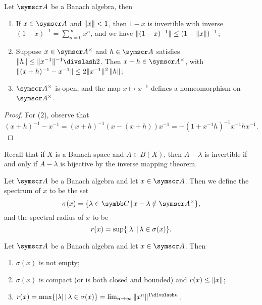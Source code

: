 \begin{proposition}
  Let $\BA{A}$ be a Banach algebra, then
  \begin{enumerate}
    \item If $x\in \BA{A}$ and $\Vert x\Vert<1$, then $1-x$ is invertible with inverse $(1-x)^{-1}=\sum_{n=0}^\infty x^n$, and we have $\Vert(1-x)^{-1}\Vert\leq (1-\Vert x\Vert)^{-1}$;
    \item Suppose $x\in \BA{A}^\times$ and $h\in \BA{A}$ satisfies $\NORM{h}\leq\NORM{x^{-1}}^{-1}\DIV 2$. Then $x+h\in \BA{A}^{\times}$, with $\Vert(x+h)^{-1}-x^{-1}\Vert\leq 2\Vert x^{-1}\Vert^2\,\Vert h\Vert$;
    \item $\BA{A}^\times$ is open, and the map $x\mapsto x^{-1}$ defines a homeomorphism on $\BA{A}^\times$.
  \end{enumerate}
\end{proposition}

\begin{proof}
  For (2), observe that
  \begin{equation}
    (x+h)^{-1}-x^{-1}=(x+h)^{-1}(x-(x+h))x^{-1}=-(1+x^{-1}h)^{-1}x^{-1}hx^{-1}.
  \end{equation}
\end{proof}

Recall that if $X$ is a Banach space and $A\in B(X)$, then $A-\lambda$ is invertible if and only if $A-\lambda$ is bijective by the inverse mapping theorem.

\begin{definition}
  Let $\BA A$ be a Banach algebra and let $x\in \BA A$. Then we define the spectrum of $x$ to be the set
  \begin{equation*}
    \sigma(x)=\{\lambda\in \CC\VERT x-\lambda\notin \BA{A}^{\times}\},
  \end{equation*}
  and the spectral radius of $x$ to be
  \begin{equation*}
    r(x)=\sup\{\vert\lambda\vert\,\vert\, \lambda\in \sigma(x)\}.
  \end{equation*}
\end{definition}

\begin{proposition}
  Let $\BA A$ be a Banach algebra and let $x\in \BA A$. Then
  \begin{enumerate}
    \item $\sigma(x)$ is not empty;
    \item $\sigma(x)$ is compact (or is both closed and bounded) and $r(x)\leq \Vert x\Vert$;
    \item $r(x)=\max\{\ABS{\lambda}\VERT \lambda\in \sigma(x)\}=\lim_{n\to\infty}\NORM{x^n}^{1\DIV n}$.
  \end{enumerate}
\end{proposition}

